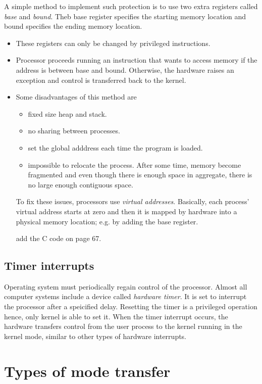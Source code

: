 A simple method to implement such protection is to use two extra registers called \textit{base} and \textit{bound}. Theb base register specifies the starting memory location and bound specifies the ending memory location.
\begin{itemize}
    \item These registers can only be changed by privileged instructions.
    \item Processor proceeds running an instruction that wants to access memory if the address is between base and bound. Otherwise, the hardware raises an exception and control is transferred back to the kernel.
    \item Some disadvantages of this method are 
    \begin{itemize}
        \item fixed size heap and stack.
        \item no sharing between processes.
        \item set the global adddress each time the program is loaded.
        \item impossible to relocate the process. After some time, memory become fragmented and even though there is enough space in aggregate, there is no large enough contiguous space.
    \end{itemize}
    To fix these issues, processors use \textit{virtual addresses}. Basically, each process' virtual address starts at zero and then it is mapped by hardware into a physical memory location; e.g. by adding the base register.

    add the C code on page 67.
\end{itemize}

\subsection{Timer interrupts}
Operating system must periodically regain control of the processor. Almost all computer systems include a device called \textit{hardware timer}. It is set to interrupt the processor after a speicified delay.  Resetting the timer is a privileged operation hence, only kernel is able to set it. When the timer interrupt occurs, the hardware transfers control from the user process to the kernel running in the kernel mode, similar to other types of hardware interrupts. 

\section{Types of mode transfer}

